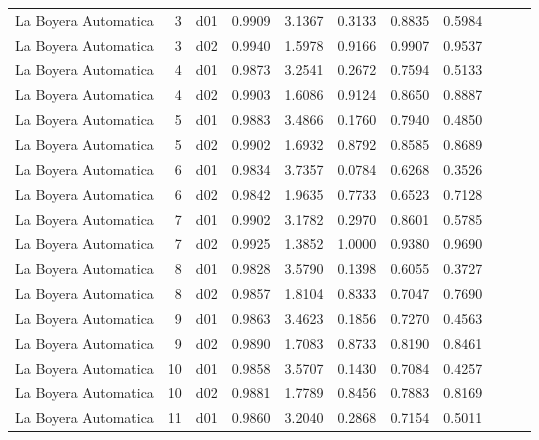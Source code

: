 \begin{landscape}
\begin{longtable}{p{2cm}rrrrrrrrrr}
 La Boyera Automatica  &          3 &     d01 &   0.9909 &  3.1367 &        0.3133 &           0.8835 &  0.5984 \\
 La Boyera Automatica  &          3 &     d02 &   0.9940 &  1.5978 &        0.9166 &           0.9907 &  0.9537 \\
 La Boyera Automatica  &          4 &     d01 &   0.9873 &  3.2541 &        0.2672 &           0.7594 &  0.5133 \\
 La Boyera Automatica  &          4 &     d02 &   0.9903 &  1.6086 &        0.9124 &           0.8650 &  0.8887 \\
 La Boyera Automatica  &          5 &     d01 &   0.9883 &  3.4866 &        0.1760 &           0.7940 &  0.4850 \\
 La Boyera Automatica  &          5 &     d02 &   0.9902 &  1.6932 &        0.8792 &           0.8585 &  0.8689 \\
 La Boyera Automatica  &          6 &     d01 &   0.9834 &  3.7357 &        0.0784 &           0.6268 &  0.3526 \\
 La Boyera Automatica  &          6 &     d02 &   0.9842 &  1.9635 &        0.7733 &           0.6523 &  0.7128 \\
 La Boyera Automatica  &          7 &     d01 &   0.9902 &  3.1782 &        0.2970 &           0.8601 &  0.5785 \\
 La Boyera Automatica  &          7 &     d02 &   0.9925 &  1.3852 &        1.0000 &           0.9380 &  0.9690 \\
 La Boyera Automatica  &          8 &     d01 &   0.9828 &  3.5790 &        0.1398 &           0.6055 &  0.3727 \\
 La Boyera Automatica  &          8 &     d02 &   0.9857 &  1.8104 &        0.8333 &           0.7047 &  0.7690 \\
 La Boyera Automatica  &          9 &     d01 &   0.9863 &  3.4623 &        0.1856 &           0.7270 &  0.4563 \\
 La Boyera Automatica  &          9 &     d02 &   0.9890 &  1.7083 &        0.8733 &           0.8190 &  0.8461 \\
 La Boyera Automatica  &         10 &     d01 &   0.9858 &  3.5707 &        0.1430 &           0.7084 &  0.4257 \\
 La Boyera Automatica  &         10 &     d02 &   0.9881 &  1.7789 &        0.8456 &           0.7883 &  0.8169 \\
 La Boyera Automatica  &         11 &     d01 &   0.9860 &  3.2040 &        0.2868 &           0.7154 &  0.5011 \\

\end{longtable}
\end{landscape}
